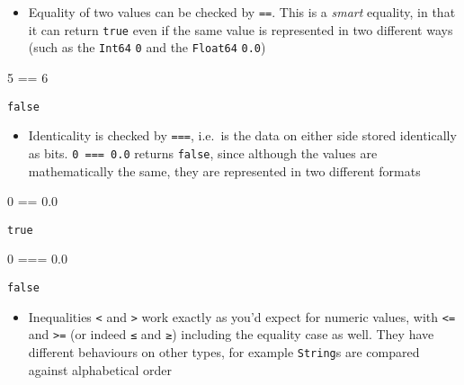 \documentclass[
  letterpaper,
  DIV=11,
  numbers=noendperiod]{scrreprt}
\newenvironment{Shaded}{\begin{snugshade}}{\end{snugshade}}
\newcommand{\FloatTok}[1]{\textcolor[rgb]{0.68,0.00,0.00}{#1}}
\newcommand{\OperatorTok}[1]{\textcolor[rgb]{0.37,0.37,0.37}{#1}}
\providecommand{\tightlist}{%
  \setlength{\itemsep}{0pt}\setlength{\parskip}{0pt}}\usepackage{longtable,booktabs,array}
\begin{document}
\begin{itemize}
\tightlist
\item
  Equality of two values can be checked by \texttt{==}. This is a
  \emph{smart} equality, in that it can return \texttt{true} even if the
  same value is represented in two different ways (such as the
  \texttt{Int64} \texttt{0} and the \texttt{Float64} \texttt{0.0})
\end{itemize}

\begin{Shaded}
\begin{Highlighting}[]
\FloatTok{5} \OperatorTok{==} \FloatTok{6}
\end{Highlighting}
\end{Shaded}

\begin{verbatim}
false
\end{verbatim}

\begin{itemize}
\tightlist
\item
  Identicality is checked by \texttt{===}, i.e.~is the data on either
  side stored identically as bits. \texttt{0\ ===\ 0.0} returns
  \texttt{false}, since although the values are mathematically the same,
  they are represented in two different formats
\end{itemize}

\begin{Shaded}
\begin{Highlighting}[]
\FloatTok{0} \OperatorTok{==} \FloatTok{0.0}
\end{Highlighting}
\end{Shaded}

\begin{verbatim}
true
\end{verbatim}

\begin{Shaded}
\begin{Highlighting}[]
\FloatTok{0} \OperatorTok{===} \FloatTok{0.0}
\end{Highlighting}
\end{Shaded}

\begin{verbatim}
false
\end{verbatim}

\begin{itemize}
\tightlist
\item
  Inequalities \texttt{\textless{}} and \texttt{\textgreater{}} work
  exactly as you'd expect for numeric values, with \texttt{\textless{}=}
  and \texttt{\textgreater{}=} (or indeed \texttt{≤} and \texttt{≥})
  including the equality case as well. They have different behaviours on
  other types, for example \texttt{String}s are compared against
  alphabetical order
\end{itemize}
\end{document}
